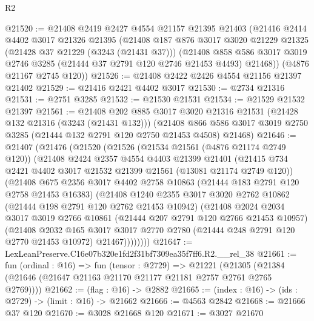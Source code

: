 \begin{lexlean}{R2}
\begin{coremodule}
@21520 := @21408
    @2419
    @2427
    @4554
    @21157
    @21395
    @21403
    (@21416
      @2414
      @4402
      @3017
      @21326
      @21395
      (@21408
        @187
        @876
        @3017
        @3020
        @21229
        @21325
        (@21428 @37 @21229 (@3243 (@21431 @37)))
        (@21408
          @858
          @586
          @3017
          @3019
          @2746
          @3285
          (@21444 @37 @2791 @120 @2746 @21453 @4493)
          @21468))
      (@4876 @21167 @2745 @120))
@21526 := @21408 @2422 @2426 @4554 @21156 @21397 @21402
@21529 := @21416 @2421 @4402 @3017
@21530 := @2734 @21316
@21531 := @2751 @3285
@21532 := @21530 @21531
@21534 := @21529 @21532 @21397
@21561 := @21408
    @202
    @885
    @3017
    @3020
    @21316
    @21531
    (@21428 @132 @21316 (@3243 (@21431 @132)))
    (@21408 @866 @586 @3017 @3019 @2750 @3285 (@21444 @132 @2791 @120 @2750 @21453 @4508) @21468)
@21646 := @21407
    (@21476
      (@21520
        (@21526
          (@21534 @21561 (@4876 @21174 @2749 @120))
          (@21408
            @2424
            @2357
            @4554
            @4403
            @21399
            @21401
            (@21415 @734 @2421 @4402 @3017 @21532 @21399 @21561 (@13081 @21174 @2749 @120))
            (@21408
              @675
              @2356
              @3017
              @4402
              @2758
              @10863
              (@21444 @183 @2791 @120 @2758 @21453 @16383)
              (@21408
                @1240
                @2355
                @3017
                @3020
                @2762
                @10862
                (@21444 @198 @2791 @120 @2762 @21453 @10942)
                (@21408
                  @2024
                  @2034
                  @3017
                  @3019
                  @2766
                  @10861
                  (@21444 @207 @2791 @120 @2766 @21453 @10957)
                  (@21408
                    @2032
                    @165
                    @3017
                    @3017
                    @2770
                    @2780
                    (@21444 @248 @2791 @120 @2770 @21453 @10972)
                    @21467))))))))
@21647 := LexLeanPreserve.C16e07b320e1fd2f31bf7309ea35f7ff6.R2.__rel_38
@21661 := fun (ordinal : @16) =>
  fun (tensor : @2729) =>
  @21221 (@21305 (@21384 (@21646 (@21647 @21163 @21170 @21177 @21181 @2757 @2761 @2765 @2769))))
@21662 := (flag : @16) -> @2882
@21665 := (index : @16) -> (ids : @2729) -> (limit : @16) -> @21662
@21666 := @4563 @2842
@21668 := @21666 @37 @120
@21670 := @3028 @21668 @120
@21671 := @3027 @21670

\end{coremodule}
\end{lexlean}
